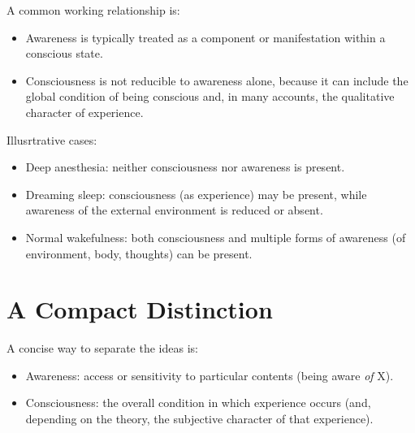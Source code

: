 \documentclass[a4paper]{article}
\begin{document}
        A common working relationship is:
        \begin{itemize}
            \item Awareness is typically treated as a component or manifestation within a conscious state.
            \item Consciousness is not reducible to awareness alone, because it can include the global condition of being conscious and, in many accounts, the qualitative character of experience.
        \end{itemize}
        
        Illusrtrative cases:
        \begin{itemize}
            \item Deep anesthesia: neither consciousness nor awareness is present.
            \item Dreaming sleep: consciousness (as experience) may be present, while awareness of the external environment is reduced or absent.
            \item Normal wakefulness: both consciousness and multiple forms of awareness (of environment, body, thoughts) can be present.
        \end{itemize}
    
    
    \section{A Compact Distinction}
        
        A concise way to separate the ideas is:
        \begin{itemize}
            \item Awareness: access or sensitivity to particular contents (being aware \emph{of} X).
            \item Consciousness: the overall condition in which experience occurs (and, depending on the theory, the subjective character of that experience).
        \end{itemize}
\end{document}
